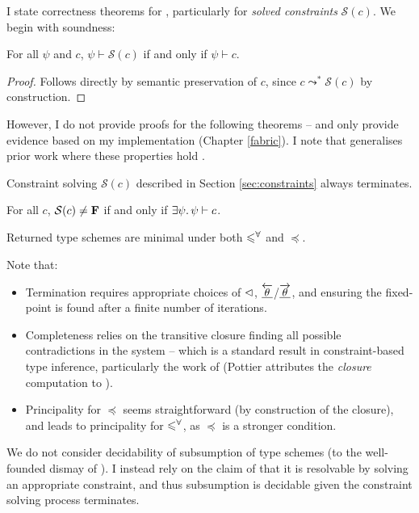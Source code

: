 I state correctness theorems for \inference{}, particularly for \emph{solved constraints} $\mathcal S(c)$. We begin with soundness:
\begin{theorem}[Soundness]
    For all $\psi$ and $c$, $\psi \vdash \mathcal S(c)$ if and only if $\psi \vdash c$.
\end{theorem}
\begin{proof}
    Follows directly by semantic preservation of $c$, since $c \leadsto^* \mathcal S(c)$ by construction.
\end{proof}

However, I do not provide proofs for the following theorems -- and only provide evidence based on my implementation (Chapter \ref{fabric}). I note that \inference{} generalises prior work where these properties hold \cite{simple-sub, mlstruct}. 

\begin{conjecture}[Termination]
    Constraint solving $\mathcal S(c)$ described in Section \ref{sec:constraints} always terminates.
\end{conjecture}

\begin{conjecture}[Completeness]    
    For all $c$, $\mathcal S(c) \ne \mathbf F$ if and only if $\exists \psi \ldotp \psi \vdash c$.
\end{conjecture}

\begin{conjecture}[Principality]
    Returned type schemes are minimal under both $\leqslant^\forall$ and $\preceq$.
\end{conjecture}

Note that: \begin{itemize}
    \item Termination requires appropriate choices of $\lhd$, $\underline{\overleftarrow{\theta}}$/$\underline{\overrightarrow{\theta}}$, and ensuring the fixed-point is found after a finite number of iterations.
    \item Completeness relies on the transitive closure finding all possible contradictions in the system -- which is a standard result in constraint-based type inference, particularly the work of \textcite{pottier-framework} (Pottier attributes the \emph{closure} computation to \textcite{closure-in-type-inference}).
    \item Principality for $\preceq$ seems straightforward (by construction of the closure), and leads to principality for $\leqslant^\forall$, as $\preceq$ is a stronger condition.
\end{itemize}
We do not consider decidability of subsumption of type schemes (to the well-founded dismay of \textcite{dolan-thesis}). I instead rely on the claim of \textcite{mlstruct} that it is resolvable by solving an appropriate constraint, and thus subsumption is decidable given the constraint solving process terminates.

